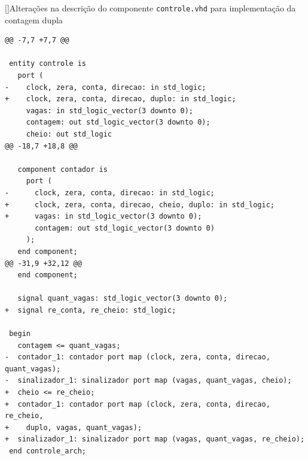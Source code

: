 \documentclass[a4,12pt]{horizon-theme}
\newenvironment{code}{\captionsetup{type=listing}}{}
\begin{document}
\newpage
\begin{code}
  []{Alterações na descrição do componente \texttt{controle.vhd} para implementação da contagem dupla\footnotemark}
  \label{lst:desafio_controle}
  \begin{verbatim}
@@ -7,7 +7,7 @@
 
 entity controle is
   port (
-    clock, zera, conta, direcao: in std_logic;
+    clock, zera, conta, direcao, duplo: in std_logic;
     vagas: in std_logic_vector(3 downto 0);
     contagem: out std_logic_vector(3 downto 0);
     cheio: out std_logic
@@ -18,7 +18,8 @@
 
   component contador is
     port (
-      clock, zera, conta, direcao: in std_logic;
+      clock, zera, conta, direcao, cheio, duplo: in std_logic;
+      vagas: in std_logic_vector(3 downto 0);
       contagem: out std_logic_vector(3 downto 0)
     );
   end component;
@@ -31,9 +32,12 @@
   end component;
   
   signal quant_vagas: std_logic_vector(3 downto 0);
+  signal re_conta, re_cheio: std_logic;
 
 begin
   contagem <= quant_vagas;
-  contador_1: contador port map (clock, zera, conta, direcao, quant_vagas);
-  sinalizador_1: sinalizador port map (vagas, quant_vagas, cheio);
+  cheio <= re_cheio;
+  contador_1: contador port map (clock, zera, conta, direcao, re_cheio, 
+    duplo, vagas, quant_vagas);
+  sinalizador_1: sinalizador port map (vagas, quant_vagas, re_cheio);
 end controle_arch;
\end{verbatim}
\end{code}

\end{document}
